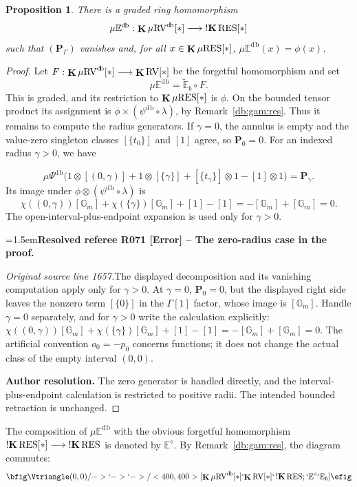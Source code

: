 \documentclass[12pt]{amsart}
\newcommand{\ResolvedRefereeRemark}[5]{%
  \par\medskip\begingroup\normalfont\small\color{gray}%
  \emergencystretch=1.5em\noindent\textbf{Resolved referee R#1 [#2] -- #3.}\par\nobreak\noindent #4\par
  \medskip\color{ResolutionGreen}\noindent\textbf{Author resolution.} #5\par
  \endgroup\medskip
}
\theoremstyle{plain}
\newtheorem{prop}[thm]{Proposition}
\theoremstyle{definition}
\theoremstyle{remark}
\numberwithin{equation}{section}
\theoremstyle{plain}
\newcommand{\RV}{\textup{RV}}
\newcommand{\G}{\mathds{G}}
\newcommand{\0}{\emptyset}
\newcommand{\bb}[1]{\mathbb{#1}}
\newcommand{\fun}{\longrightarrow}
\newcommand{\mgRV}{{\mu}{\RV}}
\newcommand{\RES}{\textup{RES}}
\newcommand{\mgRES}{{\mu}{\RES}}
\newcommand{\mgE}{{\mu}{\bb E}}
\DeclareMathOperator{\ggk}{\mathbf{K}}
\DeclareMathOperator{\sggk}{!\mathbf{K}}
\DeclareMathOperator{\db}{d \! b}
\begin{document}
\begin{prop}\label{prop:eu:retr:k:db}
There is a graded ring homomorphism
\[
  \mgE^{\db}: \ggk \mgRV^{\db}[*] \fun \sggk \RES[*]
\]
such that $(\bm P_\Gamma)$ vanishes and, for all $x \in \ggk \mgRES[*]$, $\mgE^{\db}(x) = \phi(x)$.
\end{prop}
\begin{proof}
Let $F:\ggk\mgRV^{\db}[*]\fun\ggk\RV[*]$ be the forgetful homomorphism and set
\[
\mgE^{\db}=\widetilde{\bb E}_b\circ F.
\]
This is graded, and its restriction to $\ggk\mgRES[*]$ is $\phi$. On the bounded tensor product its assignment is $\phi\times(\psi^{\db}\circ\lambda)$, by Remark~\ref{db:gam:res}. Thus it remains to compute the radius generators.
If $\gamma=0$, the annulus is empty and the value-zero singleton classes $[\{t_0\}]$ and $[1]$ agree, so $\bm P_0=0$. For an indexed radius $\gamma>0$, we have

\[
{\mu}\Psi^{\db}\bigl(1\otimes[(0,\gamma)]+1\otimes[\{\gamma\}]
+[\{t_\gamma\}]\otimes1-[1]\otimes1\bigr)=\bm P_\gamma.
\]
Its image under $\phi\otimes(\psi^{\db}\circ\lambda)$ is
\[
\chi((0,\gamma))[\G_m]+\chi(\{\gamma\})[\G_m]+[1]-[1]
=-[\G_m]+[\G_m]=0.
\]
The open-interval-plus-endpoint expansion is used only for $\gamma>0$.
\label{review:section4:T001:end}

\ResolvedRefereeRemark{071}{Error}{The zero-radius case in the proof}{%
\textit{Original source line 1657.}\quad The displayed decomposition and its vanishing computation apply only for $\gamma>0$. At $\gamma=0$, $\bm P_0=0$, but the displayed right side leaves the nonzero term $[\{0\}]$ in the $\Gamma[1]$ factor, whose image is $[\mathbb G_m]$. Handle $\gamma=0$ separately, and for $\gamma>0$ write the calculation explicitly: $\chi((0,\gamma))[\mathbb G_m]+\chi(\{\gamma\})[\mathbb G_m]+[1]-[1]=-[\mathbb G_m]+[\mathbb G_m]=0$. The artificial convention $o_0=-p_0$ concerns functions; it does not change the actual class of the empty interval $(0,0)$.
}{The zero generator is handled directly, and the interval-plus-endpoint calculation is restricted to positive radii. The intended bounded retraction is unchanged.}
\end{proof}

The composition of $\mgE^{\db}$ with the obvious forgetful homomorphism $\sggk \RES[*] \fun \sggk \RES$ is denoted by $\bb E^{\diamond}$.  By Remark~\ref{db:gam:res}, the diagram commutes:
\begin{equation}\label{edb:eb:com}
\bfig
 \Vtriangle(0,0)/->`->`->/<400, 400>[{\ggk \mgRV^{\db}[*]}`{\ggk \RV[*]}`\sggk \RES; `\bb E^{\diamond}`\bb E_b]
\efig
\end{equation}
\end{document}
